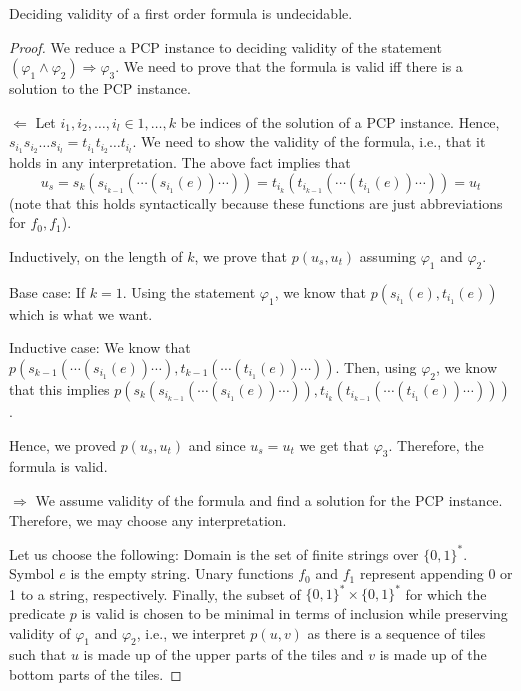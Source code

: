 \begin{theorem}
    Deciding validity of a first order formula is undecidable.
\end{theorem}
\begin{proof}
    We reduce a PCP instance to deciding validity of the statement $(\varphi_1 \land \varphi_2) \Rightarrow \varphi_3$. We need to prove that the formula is valid iff there is a solution to the PCP instance.

    $\Leftarrow$
    Let $i_1, i_2, \ldots, i_l \in 1, \ldots, k$ be indices of the solution of a PCP instance. Hence, $s_{i_1}s_{i_2}\ldots s_{i_l} = t_{i_1}t_{i_2}\ldots t_{i_l}$. We need to show the validity of the formula, i.e., that it holds in any interpretation. The above fact implies that
    $$u_s = s_{k}(s_{i_{k-1}}(\cdots(s_{i_1}(e))\cdots)) = t_{i_k}(t_{i_{k-1}}(\cdots(t_{i_1}(e))\cdots)) = u_t$$
    (note that this holds syntactically because these functions are just abbreviations for $f_0, f_1$).
    
    Inductively, on the length of $k$, we prove that $p(u_s, u_t)$ assuming $\varphi_1$ and $\varphi_2$.

    Base case: If $k = 1$. Using the statement $\varphi_1$, we know that $p(s_{i_1}(e), t_{i_1}(e))$ which is what we want.
    
    Inductive case: We know that $p(s_{k-1}(\cdots(s_{i_1}(e))\cdots), t_{k-1}(\cdots(t_{i_1}(e))\cdots))$. Then, using $\varphi_2$, we know that this implies $p(s_{k}(s_{i_{k-1}}(\cdots(s_{i_1}(e))\cdots)), t_{i_k}(t_{i_{k-1}}(\cdots(t_{i_1}(e))\cdots)))$.
    
    Hence, we proved $p(u_s, u_t)$ and since $u_s = u_t$ we get that $\varphi_3$. Therefore, the formula is valid.

    $\Rightarrow$
    We assume validity of the formula and find a solution for the PCP instance. Therefore, we may choose any interpretation.
    
    Let us choose the following: Domain is the set of finite strings over $\{0, 1\}^{*}$. Symbol $e$ is the empty string. Unary functions $f_0$ and $f_1$ represent appending 0 or 1 to a string, respectively. Finally, the subset of $\{0, 1\}^{*} \times \{0, 1\}^{*}$ for which the predicate $p$ is valid is chosen to be minimal in terms of inclusion while preserving validity of $\varphi_1$ and $\varphi_2$, i.e., we interpret $p(u, v)$ as there is a sequence of tiles such that $u$ is made up of the upper parts of the tiles and $v$ is made up of the bottom parts of the tiles.
    

\end{proof}
